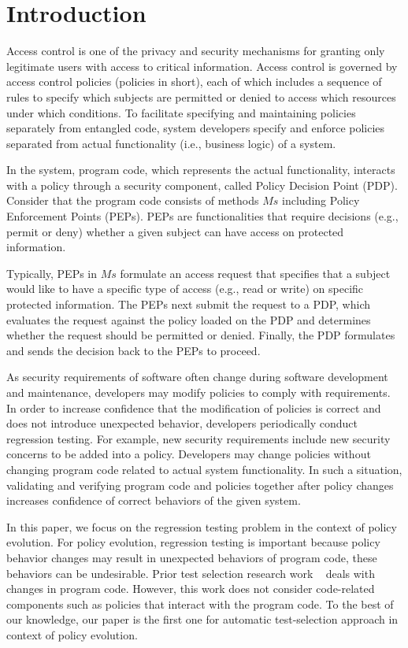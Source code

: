 \section{Introduction} \label{sec:introduction}
 
Access control is one of the privacy and security mechanisms for granting only legitimate users with access to critical information. 
Access control is governed by access control policies (policies in short), each of which includes a sequence of rules to specify 
which subjects are permitted or denied to access which resources under which conditions. To facilitate specifying and maintaining policies separately from entangled code, 
system developers specify and enforce policies separated from actual functionality (i.e., business logic) of a system.

In the system, program code, which represents the actual functionality,
interacts with a policy through a security component, called Policy Decision Point (PDP).
Consider that the program code consists of methods $Ms$ including Policy Enforcement Points (PEPs).
PEPs are functionalities that require decisions (e.g., permit or deny) whether a given subject can have access on protected information.

Typically, PEPs in $Ms$ formulate an access request that specifies that a subject would like to have a specific type of access (e.g., read or write) on specific protected information. 
The PEPs next submit the request to a PDP, which evaluates the request against the policy loaded on the PDP and determines whether the request should be permitted or denied. Finally, 
the PDP formulates and sends the
decision back to the PEPs to proceed.

As security requirements of software often change during software development and maintenance,
developers may modify policies to comply with requirements. In order to increase confidence that the modification of policies is correct and
does not introduce unexpected behavior, developers periodically conduct regression testing.
For example, new security requirements include new security concerns to be added into a policy.
Developers may change policies without changing program code related to actual system functionality.
In such a situation, validating and verifying program code and policies together after policy changes
increases confidence of correct behaviors of the given system.


In this paper, we focus on the regression testing problem in the context of policy evolution.
For policy evolution, regression testing is important because policy behavior changes may
result in unexpected behaviors of program code, these behaviors can be undesirable.
Prior test selection research work ~\cite{Rothermel:1996:ART:235681.235682,Graves:2001:ESR:367008.367020,Elbaum:2000:PTC:347324.348910}
deals with changes in program code. However, this work does not consider code-related components such as policies that interact with the program code.
To the best of our knowledge,
our paper is the first one for automatic test-selection approach in context of policy
evolution.

